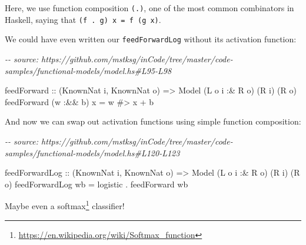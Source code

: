 \documentclass[]{article}
\newenvironment{Shaded}{}{}
\newcommand{\CommentTok}[1]{\textcolor[rgb]{0.38,0.63,0.69}{\textit{#1}}}
\newcommand{\DataTypeTok}[1]{\textcolor[rgb]{0.56,0.13,0.00}{#1}}
\newcommand{\NormalTok}[1]{#1}
\newcommand{\OperatorTok}[1]{\textcolor[rgb]{0.40,0.40,0.40}{#1}}
\newcommand{\OtherTok}[1]{\textcolor[rgb]{0.00,0.44,0.13}{#1}}
\renewcommand{\href}[2]{#2\footnote{\url{#1}}}
\begin{document}
Here, we use function composition \texttt{(.)}, one of the most common
combinators in Haskell, saying that \texttt{(f\ .\ g)\ x\ =\ f\ (g\ x)}.

We could have even written our \texttt{feedForwardLog} without its activation
function:

\begin{Shaded}
\begin{Highlighting}[]
\CommentTok{{-}{-} source: https://github.com/mstksg/inCode/tree/master/code{-}samples/functional{-}models/model.hs\#L95{-}L98}

\NormalTok{feedForward}
\OtherTok{    ::}\NormalTok{ (}\DataTypeTok{KnownNat}\NormalTok{ i, }\DataTypeTok{KnownNat}\NormalTok{ o)}
    \OtherTok{=\textgreater{}} \DataTypeTok{Model}\NormalTok{ (}\DataTypeTok{L}\NormalTok{ o i }\OperatorTok{:\&} \DataTypeTok{R}\NormalTok{ o) (}\DataTypeTok{R}\NormalTok{ i) (}\DataTypeTok{R}\NormalTok{ o)}
\NormalTok{feedForward (w }\OperatorTok{:\&\&}\NormalTok{ b) x }\OtherTok{=}\NormalTok{ w }\OperatorTok{\#\textgreater{}}\NormalTok{ x }\OperatorTok{+}\NormalTok{ b}
\end{Highlighting}
\end{Shaded}

And now we can swap out activation functions using simple function composition:

\begin{Shaded}
\begin{Highlighting}[]
\CommentTok{{-}{-} source: https://github.com/mstksg/inCode/tree/master/code{-}samples/functional{-}models/model.hs\#L120{-}L123}

\NormalTok{feedForwardLog\textquotesingle{}}
\OtherTok{    ::}\NormalTok{ (}\DataTypeTok{KnownNat}\NormalTok{ i, }\DataTypeTok{KnownNat}\NormalTok{ o)}
    \OtherTok{=\textgreater{}} \DataTypeTok{Model}\NormalTok{ (}\DataTypeTok{L}\NormalTok{ o i }\OperatorTok{:\&} \DataTypeTok{R}\NormalTok{ o) (}\DataTypeTok{R}\NormalTok{ i) (}\DataTypeTok{R}\NormalTok{ o)}
\NormalTok{feedForwardLog\textquotesingle{} wb }\OtherTok{=}\NormalTok{ logistic }\OperatorTok{.}\NormalTok{ feedForward wb}
\end{Highlighting}
\end{Shaded}

Maybe even a \href{https://en.wikipedia.org/wiki/Softmax_function}{softmax}
classifier!
\end{document}
